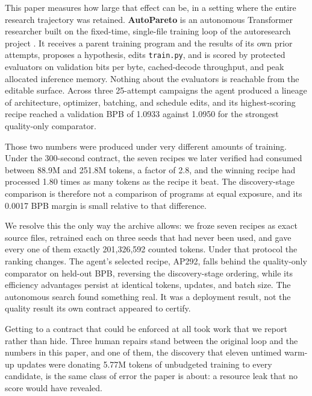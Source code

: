 \documentclass{article}
\begin{document}
This paper measures how large that effect can be, in a setting where the entire research trajectory was retained. \textbf{AutoPareto} is an autonomous Transformer researcher built on the fixed-time, single-file training loop of the autoresearch project \citep{autoresearch}. It receives a parent training program and the results of its own prior attempts, proposes a hypothesis, edits \texttt{train.py}, and is scored by protected evaluators on validation bits per byte, cached-decode throughput, and peak allocated inference memory. Nothing about the evaluators is reachable from the editable surface. Across three 25-attempt campaigns the agent produced a lineage of architecture, optimizer, batching, and schedule edits, and its highest-scoring recipe reached a validation BPB of 1.0933 against 1.0950 for the strongest quality-only comparator.

Those two numbers were produced under very different amounts of training. Under the 300-second contract, the seven recipes we later verified had consumed between 88.9M and 251.8M tokens, a factor of 2.8, and the winning recipe had processed 1.80 times as many tokens as the recipe it beat. The discovery-stage comparison is therefore not a comparison of programs at equal exposure, and its 0.0017 BPB margin is small relative to that difference.

We resolve this the only way the archive allows: we froze seven recipes as exact source files, retrained each on three seeds that had never been used, and gave every one of them exactly 201,326,592 counted tokens. Under that protocol the ranking changes. The agent's selected recipe, AP292, falls behind the quality-only comparator on held-out BPB, reversing the discovery-stage ordering, while its efficiency advantages persist at identical tokens, updates, and batch size. The autonomous search found something real. It was a deployment result, not the quality result its own contract appeared to certify.

Getting to a contract that could be enforced at all took work that we report rather than hide. Three human repairs stand between the original loop and the numbers in this paper, and one of them, the discovery that eleven untimed warm-up updates were donating 5.77M tokens of unbudgeted training to every candidate, is the same class of error the paper is about: a resource leak that no score would have revealed.
\end{document}
